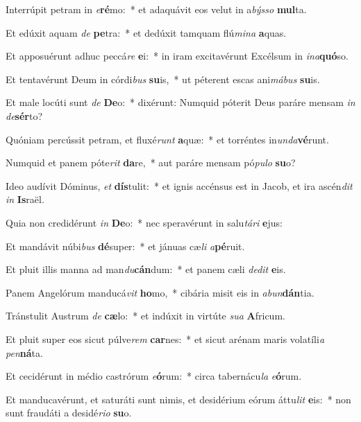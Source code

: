 \item Interrúpit petram in \textit{e}\textbf{ré}mo:~* et adaquávit eos velut in a\textit{býs}\textit{so} \textbf{mul}ta.
\item Et edúxit aquam \textit{de} \textbf{pe}tra:~* et dedúxit tamquam flú\textit{mi}\textit{na} \textbf{a}quas.
\item Et apposuérunt adhuc peccá\textit{re} \textbf{e}i:~* in iram excitavérunt Excélsum in \textit{in}\textit{a}\textbf{quó}so.
\item Et tentavérunt Deum in córdi\textit{bus} \textbf{su}is,~* ut péterent escas ani\textit{má}\textit{bus} \textbf{su}is.
\item Et male locúti sunt \textit{de} \textbf{De}o:~* dixérunt: Numquid póterit Deus paráre mensam \textit{in} \textit{de}\textbf{sér}to?
\item Quóniam percússit petram, et fluxé\textit{runt} \textbf{a}quæ:~* et torréntes in\textit{un}\textit{da}\textbf{vé}runt.
\item Numquid et panem póte\textit{rit} \textbf{da}re,~* aut paráre mensam pó\textit{pu}\textit{lo} \textbf{su}o?
\item Ideo audívit Dóminus, \textit{et} \textbf{dís}tulit:~* et ignis accénsus est in Jacob, et ira ascén\textit{dit} \textit{in} \textbf{Is}raël.
\item Quia non credidérunt \textit{in} \textbf{De}o:~* nec speravérunt in salu\textit{tá}\textit{ri} \textbf{e}jus:
\item Et mandávit núbi\textit{bus} \textbf{dé}super:~* et jánuas cæ\textit{li} \textit{a}\textbf{pé}ruit.
\item Et pluit illis manna ad man\textit{du}\textbf{cán}dum:~* et panem cæli \textit{de}\textit{dit} \textbf{e}is.
\item Panem Angelórum manducá\textit{vit} \textbf{ho}mo,~* cibária misit eis in \textit{ab}\textit{un}\textbf{dán}tia.
\item Tránstulit Austrum \textit{de} \textbf{cæ}lo:~* et indúxit in virtúte \textit{su}\textit{a} \textbf{A}fricum.
\item Et pluit super eos sicut púlve\textit{rem} \textbf{car}nes:~* et sicut arénam maris volatíli\textit{a} \textit{pen}\textbf{ná}ta.
\item Et cecidérunt in médio castrórum \textit{e}\textbf{ó}rum:~* circa tabernácu\textit{la} \textit{e}\textbf{ó}rum.
\item Et manducavérunt, et saturáti sunt nimis, et desidérium eórum áttu\textit{lit} \textbf{e}is:~* non sunt fraudáti a desidé\textit{ri}\textit{o} \textbf{su}o.
